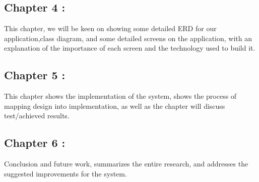\subsection{Chapter 4 :} This chapter, we will be keen on showing some detailed ERD for our application,class diagram, and some detailed screens on the application, with an explanation of the importance of each screen and the technology used to build it. 
\subsection{Chapter 5 : }This chapter shows the implementation of the system, shows the process of mapping design into implementation, as well as the chapter will discuss test/achieved results.
\subsection{Chapter 6 : }Conclusion and future work, summarizes the entire research, and addresses the suggested improvements for the system. 